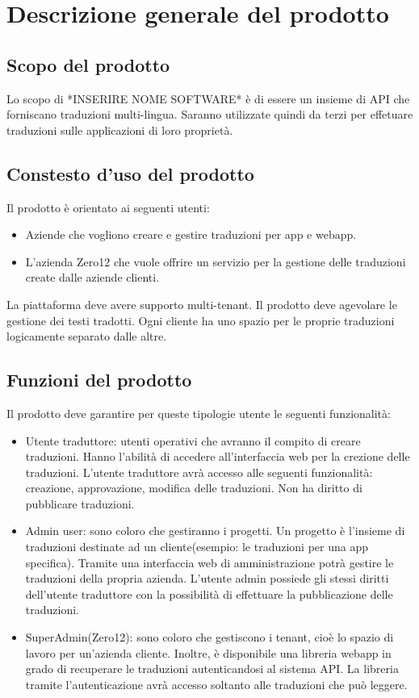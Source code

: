 \section{Descrizione generale del prodotto}
\subsection{Scopo del prodotto}
Lo scopo di *INSERIRE NOME SOFTWARE* è di essere un insieme di API che forniscano traduzioni multi-lingua. Saranno utilizzate quindi da terzi per effetuare traduzioni sulle applicazioni di loro proprietà.
\subsection{Constesto d'uso del prodotto}
Il prodotto è orientato ai seguenti utenti: 
\begin{itemize}
    \item Aziende che vogliono creare e gestire traduzioni per app e webapp.
    \item L'azienda Zero12 che vuole offrire un servizio per la gestione delle traduzioni create dalle aziende clienti.
\end{itemize}
La piattaforma deve avere supporto multi-tenant.
Il prodotto deve agevolare le gestione dei testi tradotti. Ogni cliente ha uno spazio per le proprie traduzioni logicamente separato dalle altre.
\subsection{Funzioni del prodotto}
Il prodotto deve garantire per queste tipologie utente le seguenti funzionalità:
\begin{itemize}
    \item Utente traduttore: utenti operativi che avranno il compito di creare traduzioni. Hanno l'abilità di accedere all'interfaccia web per la crezione delle traduzioni. L'utente traduttore avrà accesso alle seguenti funzionalità: creazione, approvazione, modifica delle traduzioni. Non ha diritto di pubblicare traduzioni.
    \item Admin user: sono coloro che gestiranno i progetti. Un progetto è l'insieme di traduzioni destinate ad un cliente(esempio: le traduzioni per una app specifica). Tramite una interfaccia web di amministrazione potrà gestire le traduzioni della propria azienda. L'utente admin possiede gli stessi diritti dell'utente traduttore con la possibilità di effettuare la pubblicazione delle traduzioni.
    \item SuperAdmin(Zero12): sono coloro che gestiscono i tenant, cioè lo spazio di lavoro per un'azienda cliente. 
    Inoltre, è disponibile una libreria webapp in grado di recuperare le traduzioni autenticandosi al sistema API. La libreria tramite l'autenticazione avrà accesso soltanto alle traduzioni che può leggere.
\end{itemize}
